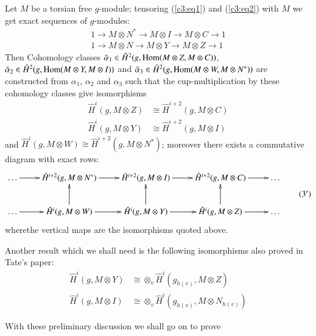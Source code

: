  Let $M$ be a torsian free $g$-module; tensoring (\ref{c3:eq1}) and
 (\ref{c3:eq2}) with 
 $M$ we get exact sequences of $g$-modules: 
 \begin{gather*}
1 \longrightarrow M \otimes N^* \longrightarrow M \otimes I
\longrightarrow M \otimes C \longrightarrow 1 \tag{$1'$}\label{c3:eq1'}\\  
1 \longrightarrow M \otimes N \longrightarrow M \otimes Y
\longrightarrow M \otimes Z \longrightarrow 1 \tag{$2'$}\label{c3:eq2'}  
 \end{gather*} 
 Then Cohomology classes $\bar{\alpha}_1 \in \hat{H}^2 (g, \operatorname{Hom} (M
 \otimes Z, M \otimes C))$, $\bar{\alpha}_2 \in \hat{H}^2 (g, \operatorname{Hom} (M
 \otimes Y, M \otimes I))$ and $\bar{\alpha}_3 \in \hat{H}^2 (g, \operatorname{Hom}
 (M \otimes W, M \otimes N^*))$ are constructed from $\alpha_1$,
 $\alpha_2$ and $\alpha_3$ such that the cup-multiplication by
 these cohomology classes give isomorphisms 
\begin{align*}
\hat{H}^i (g, M \otimes Z) & \cong \hat{H}^{i+2} (g, M \otimes C)\\
\hat{H}^i (g, M \otimes Y) & \cong \hat{H}^{i+2} (g, M \otimes I)
\end{align*}
 and $\hat{H}^i (g, M \otimes W) \cong \hat{H}^{i+2} (g, M \otimes
 N^*)$; moreover there exists a commutative diagram with exact rows: 
{\fontsize{9}{11}\selectfont
\begin{equation*}
\vcenter{\xymatrix{
\ldots \ar[r] & \hat{H}^{i+2} (g, M\otimes N^{\ast}) \ar[r] &
\hat{H}^{i+2} (g, M \otimes I)  \ar[r] & \hat{H}^{i+2} (g, M \otimes
C) \ar[r] & \ldots \\
\ldots \ar[r] & \hat{H}^i (g, M \otimes W) \ar[r] \ar[u] & \hat{H}^i
(g, M\otimes Y) \ar[r] \ar[u] & \hat{H}^i(g,M \otimes Z) \ar[r] \ar[u]&
\ldots 
}}\tag{$3'$}\label{c3:eq3'}
\end{equation*}}
where\pageoriginale the vertical maps are the isomorphisms quoted above. 

Another result which we shall need is the following isomorphisms also
proved in Tate's paper: 
\begin{align*}
 \hat{H}^{i} (g, M \otimes Y) & \cong \otimes_v \hat{H}^{i} (g_{h(v)},
 M \otimes Z) \tag{4}\label{c3:eq4}  \\
 \hat{H}^{i} (g, M \otimes I) & \cong \otimes_v \hat{H}^{i} (g_{h(v)},
 M \otimes N_{h(v)}) \tag{5}\label{c3:eq5}  
\end{align*}

With these preliminary discussion we shall go on to prove 


